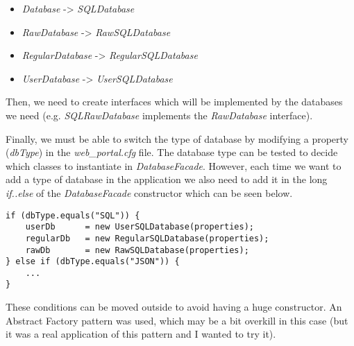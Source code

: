 \begin{itemize}
    \item \emph{Database} -> \emph{SQLDatabase}
    \item \emph{RawDatabase} -> \emph{RawSQLDatabase}
    \item \emph{RegularDatabase} -> \emph{RegularSQLDatabase}
    \item \emph{UserDatabase} -> \emph{UserSQLDatabase}
\end{itemize}

Then, we need to create interfaces which will be implemented by the databases we
need (e.g. \emph{SQLRawDatabase} implements the \emph{RawDatabase} interface).

Finally, we must be able to switch the type of database by modifying a property
(\emph{dbType}) in the \emph{web\_portal.cfg} file.
The database type can be tested to decide which classes to instantiate in
\emph{DatabaseFacade}. However, each time we want to add a type of
database in the application we also need to add it in the long \emph{if..else}
of the \emph{DatabaseFacade} constructor which can be seen below.

\begin{lstlisting}
if (dbType.equals("SQL")) {
	userDb		= new UserSQLDatabase(properties);
	regularDb	= new RegularSQLDatabase(properties);
	rawDb		= new RawSQLDatabase(properties);
} else if (dbType.equals("JSON")) {
    ...
}
\end{lstlisting}

These conditions can be moved outside to avoid having a huge constructor.
An Abstract Factory pattern was used, which may be a bit overkill in this case
(but it was a real application of this pattern and I wanted to try it).

